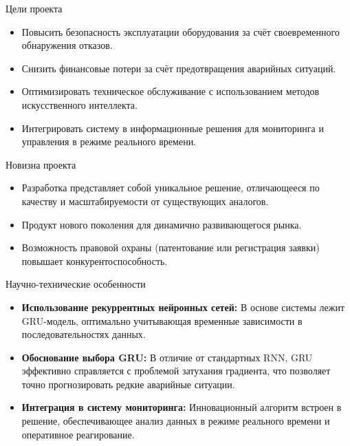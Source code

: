 \documentclass[aspectratio=169]{beamer}
\begin{document}
\begin{frame}{Цели проекта}
  \begin{itemize}
    \item Повысить безопасность эксплуатации оборудования за счёт своевременного обнаружения отказов.
    \item Снизить финансовые потери за счёт предотвращения аварийных ситуаций.
    \item Оптимизировать техническое обслуживание с использованием методов искусственного интеллекта.
    \item Интегрировать систему в информационные решения для мониторинга и управления в режиме реального времени.
  \end{itemize}
\end{frame}

\begin{frame}{Новизна проекта}
  \begin{itemize}
    \item Разработка представляет собой уникальное решение, отличающееся по качеству и масштабируемости от существующих аналогов.
    \item Продукт нового поколения для динамично развивающегося рынка.
    \item Возможность правовой охраны (патентование или регистрация заявки) повышает конкурентоспособность.
  \end{itemize}
\end{frame}

\begin{frame}{Научно-технические особенности}
  \begin{itemize}
    \item \textbf{Использование рекуррентных нейронных сетей:} В основе системы лежит GRU-модель, оптимально учитывающая временные зависимости в последовательностях данных.
    \item \textbf{Обоснование выбора GRU:} В отличие от стандартных RNN, GRU эффективно справляется с проблемой затухания градиента, что позволяет точно прогнозировать редкие аварийные ситуации.
    \item \textbf{Интеграция в систему мониторинга:} Инновационный алгоритм встроен в решение, обеспечивающее анализ данных в режиме реального времени и оперативное реагирование.
  \end{itemize}
\end{frame}
\end{document}
